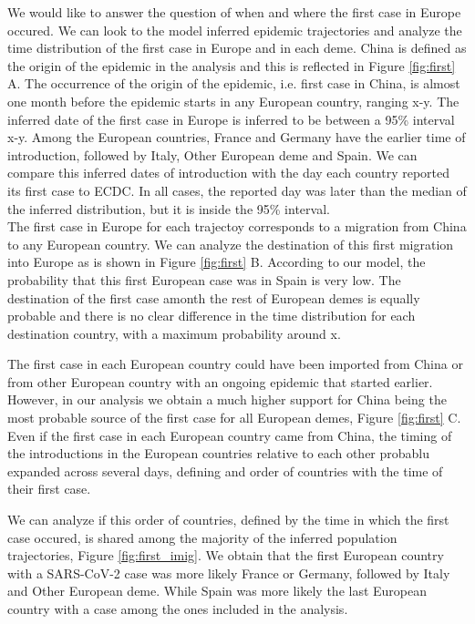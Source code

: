 \documentclass[12pt]{article}
\begin{document}
We would like to answer the question of when and where the first case in Europe occured. We can look to the model inferred epidemic trajectories and analyze the time distribution of the first case in Europe and in each deme. China is defined as the origin of the epidemic in the analysis and this is reflected in Figure \ref{fig:first} A. The occurrence of the origin of the epidemic, i.e. first case in China, is almost one month before the epidemic starts in any European country, ranging   x-y. The inferred date of the first case in Europe is inferred to be between a 95\% interval x-y. Among the European countries, France and Germany have the earlier time of introduction, followed by Italy, Other European deme and Spain. We can compare this inferred dates of introduction with the day each country reported its first case to ECDC. In all cases, the reported day was later than the median of the inferred distribution, but it is inside the 95\% interval.\\

The first case in Europe for each trajectoy corresponds to a migration from China to any European country. We can analyze the destination of this first migration into Europe as is shown in Figure \ref{fig:first} B. According to our model, the probability that this first European case was in Spain is very low. The destination of the first case amonth the rest of European demes is equally probable and there is no clear difference in the time distribution for each destination country, with a maximum probability around x.\\

The first case in each European country could have been imported from China or from other European country with an ongoing epidemic that started earlier. However, in our analysis we obtain a much higher support for China being the most probable source of the first case for all European demes, Figure \ref{fig:first} C.\\

Even if the first case in each European country came from China, the timing of the introductions in the European countries relative to each other probablu expanded across several days, defining and order of countries with the time of their first case. 

We can analyze if this order of countries, defined by the time in which the first case occured, is shared among the majority of the inferred population trajectories, Figure \ref{fig:first_imig}. We obtain that the first European country with a SARS-CoV-2 case was more likely France or Germany, followed by Italy and Other European deme. While Spain was more likely the last European country with a case among the ones included in the analysis.\\
\end{document}
